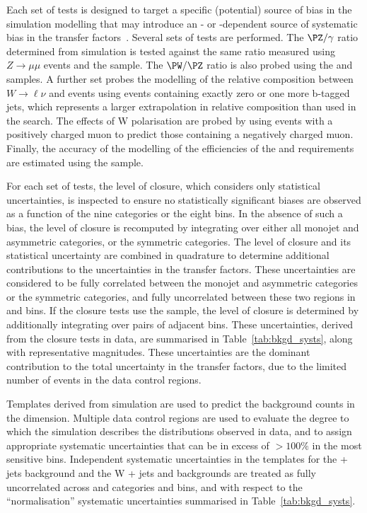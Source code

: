 Each set of tests is designed to target a specific (potential) source
of bias in the simulation modelling that may introduce an \njet- or
\scalht-dependent source of systematic bias in the transfer
factors~\cite{RA1Paper2012}. Several sets of tests are performed. The
$\PZ/\gamma$ ratio determined from simulation is tested against the
same ratio measured using $Z\rightarrow\mu\mu$ events and the \gj sample. The
$\PW/\PZ$ ratio is also probed using the \mj and \mmj samples. A
further set probes the modelling of the relative composition between
$W\rightarrow\ell\nu$ and \ttbar events using \mj events containing exactly zero or
one more b-tagged jets, which represents a larger extrapolation in
relative composition than used in the search.  The effects of W
polarisation are probed by using \mj events with a positively charged
muon to predict those containing a negatively charged muon. Finally,
the accuracy of the modelling of the efficiencies of the \alphat and
\bdphi requirements are estimated using the \mj sample. 

For each set of tests, the level of closure, which considers only
statistical uncertainties, is inspected to ensure no statistically
significant biases are observed as a function of the nine \njet
categories or the eight \scalht bins. In the absence of such a bias,
the level of closure is recomputed by integrating over either all
monojet and asymmetric \njet categories, or the symmetric \njet
categories. The level of closure and its statistical uncertainty are
combined in quadrature to determine additional contributions to the
uncertainties in the transfer factors. These uncertainties are
considered to be fully correlated between the monojet and asymmetric
\njet categories or the symmetric \njet categories, and fully
uncorrelated between these two regions in \njet and \scalht bins. If
the closure tests use the \mmj sample, the level of closure is
determined by additionally integrating over pairs of adjacent \scalht
bins. These uncertainties, derived from the closure tests in data, are
summarised in Table~\ref{tab:bkgd_systs}, along with representative
magnitudes. These uncertainties are the dominant contribution to the
total uncertainty in the transfer factors, due to the limited number
of events in the data control regions.

Templates derived from simulation are used to predict the background
counts in the \mht dimension. Multiple data control regions are used
to evaluate the degree to which the simulation describes the \mht
distributions observed in data, and to assign appropriate systematic
uncertainties that can be in excess of $>100\%$ in the most sensitive
\mht bins. Independent systematic uncertainties in the templates for
the \znunu + jets background and the W + jets and \ttbar backgrounds
are treated as fully uncorrelated across \njet and \nb categories and
\scalht bins, and with respect to the ``normalisation'' systematic
uncertainties summarised in Table~\ref{tab:bkgd_systs}.

